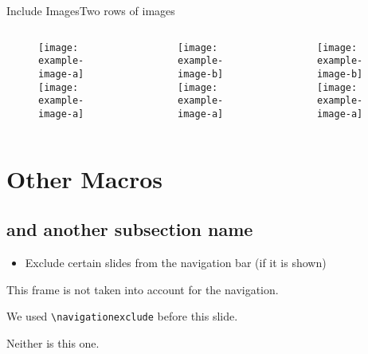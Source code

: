 \documentclass[]{beamer}
\begin{document}
\begin{frame}{Include Images}{Two rows of images}
	\begin{columns}
	\begin{column}{0.3\textwidth}
		\begin{figure}
			\texttt{[image: example-image-a]}
			\texttt{[image: example-image-a]}
		\end{figure}
	\end{column}
	\begin{column}{0.3\textwidth}
		\begin{figure}
			\texttt{[image: example-image-b]}
			\texttt{[image: example-image-a]}
		\end{figure}
	\end{column}
	\begin{column}{0.3\textwidth}
		\begin{figure}
			\texttt{[image: example-image-b]}
			\texttt{[image: example-image-a]}
		\end{figure}
	\end{column}
	\end{columns}
\end{frame}


\section{Other Macros}
\subsection*{and another subsection name}
\rptusectionpage

\begin{frame}
	\begin{itemize}
		\item Exclude certain slides from the navigation bar (if it is shown)
	\end{itemize}
\end{frame}

\navigationexclude
\begin{frame}
	This frame is not taken into account for the navigation.
	
	We used \texttt{\textbackslash navigationexclude} before this slide.
\end{frame}

\begin{frame}
	Neither is this one.
\end{frame}
\end{document}
